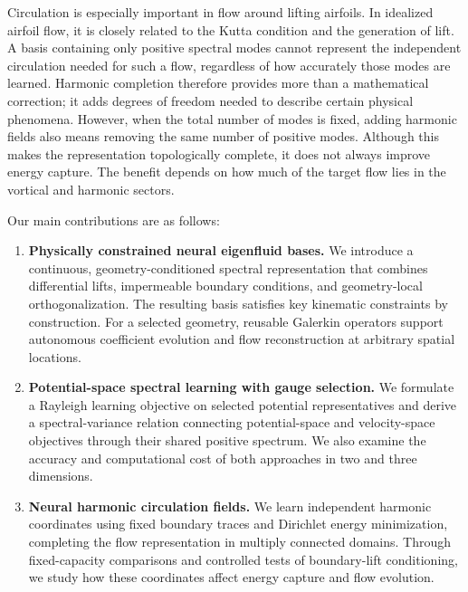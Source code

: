 Circulation is especially important in flow around lifting airfoils. In idealized airfoil flow, it is closely related to the Kutta condition and the generation of lift. A basis containing only positive spectral modes cannot represent the independent circulation needed for such a flow, regardless of how accurately those modes are learned. Harmonic completion therefore provides more than a mathematical correction; it adds degrees of freedom needed to describe certain physical phenomena. However, when the total number of modes is fixed, adding harmonic fields also means removing the same number of positive modes. Although this makes the representation topologically complete, it does not always improve energy capture. The benefit depends on how much of the target flow lies in the vortical and harmonic sectors.

\begin{samepage}
Our main contributions are as follows:
\begin{enumerate}[leftmargin=*,itemsep=3pt,topsep=4pt]
\item \textbf{Physically constrained neural eigenfluid bases.} We introduce a continuous, geometry-conditioned spectral representation that combines differential lifts, impermeable boundary conditions, and geometry-local orthogonalization. The resulting basis satisfies key kinematic constraints by construction. For a selected geometry, reusable Galerkin operators support autonomous coefficient evolution and flow reconstruction at arbitrary spatial locations.
\item \textbf{Potential-space spectral learning with gauge selection.} We formulate a Rayleigh learning objective on selected potential representatives and derive a spectral-variance relation connecting potential-space and velocity-space objectives through their shared positive spectrum. We also examine the accuracy and computational cost of both approaches in two and three dimensions.
\item \textbf{Neural harmonic circulation fields.} We learn independent harmonic coordinates using fixed boundary traces and Dirichlet energy minimization, completing the flow representation in multiply connected domains. Through fixed-capacity comparisons and controlled tests of boundary-lift conditioning, we study how these coordinates affect energy capture and flow evolution.
\end{enumerate}
\end{samepage}

\par\endgroup

